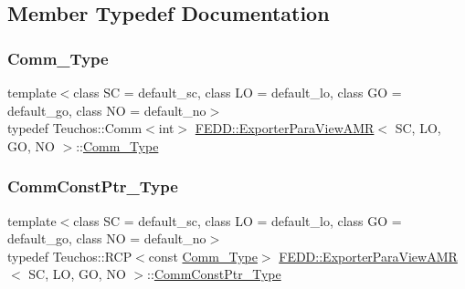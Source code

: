 \subsection{Member Typedef Documentation}
\mbox{\label{classFEDD_1_1ExporterParaViewAMR_a344240d46d7bee09b67e50de26a00526}} 
\subsubsection{\texorpdfstring{Comm\+\_\+\+Type}{Comm\_Type}}
{\footnotesize\ttfamily template$<$class SC  = default\+\_\+sc, class LO  = default\+\_\+lo, class GO  = default\+\_\+go, class NO  = default\+\_\+no$>$ \\
typedef Teuchos\+::\+Comm$<$int$>$ \hyperlink{classFEDD_1_1ExporterParaViewAMR}{F\+E\+D\+D\+::\+Exporter\+Para\+View\+A\+MR}$<$ SC, LO, GO, NO $>$\+::\hyperlink{classFEDD_1_1ExporterParaViewAMR_a344240d46d7bee09b67e50de26a00526}{Comm\+\_\+\+Type}}

\mbox{\label{classFEDD_1_1ExporterParaViewAMR_a240ffec17fbe910bc5530fb23fe8ab41}} 
\subsubsection{\texorpdfstring{Comm\+Const\+Ptr\+\_\+\+Type}{CommConstPtr\_Type}}
{\footnotesize\ttfamily template$<$class SC  = default\+\_\+sc, class LO  = default\+\_\+lo, class GO  = default\+\_\+go, class NO  = default\+\_\+no$>$ \\
typedef Teuchos\+::\+R\+CP$<$const \hyperlink{classFEDD_1_1ExporterParaViewAMR_a344240d46d7bee09b67e50de26a00526}{Comm\+\_\+\+Type}$>$ \hyperlink{classFEDD_1_1ExporterParaViewAMR}{F\+E\+D\+D\+::\+Exporter\+Para\+View\+A\+MR}$<$ SC, LO, GO, NO $>$\+::\hyperlink{classFEDD_1_1ExporterParaViewAMR_a240ffec17fbe910bc5530fb23fe8ab41}{Comm\+Const\+Ptr\+\_\+\+Type}}

